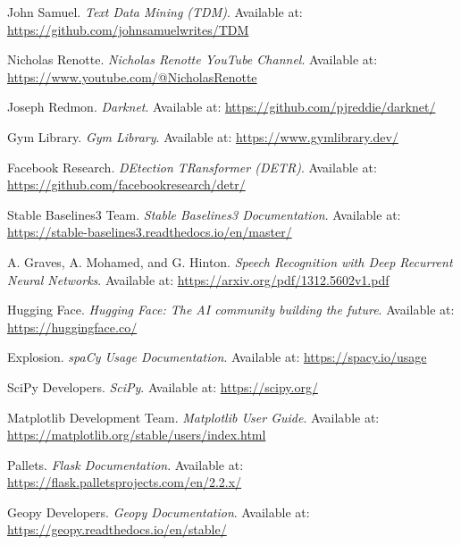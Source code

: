 \documentclass{article}
\begin{document}
    \begin{thebibliography}{9}

        John Samuel.
        \textit{Text Data Mining (TDM)}.
        Available at: \url{https://github.com/johnsamuelwrites/TDM}

        Nicholas Renotte.
        \textit{Nicholas Renotte YouTube Channel}.
        Available at: \url{https://www.youtube.com/@NicholasRenotte}

        Joseph Redmon.
        \textit{Darknet}.
        Available at: \url{https://github.com/pjreddie/darknet/}

        Gym Library.
        \textit{Gym Library}.
        Available at: \url{https://www.gymlibrary.dev/}

        Facebook Research.
        \textit{DEtection TRansformer (DETR)}.
        Available at: \url{https://github.com/facebookresearch/detr/}

        Stable Baselines3 Team.
        \textit{Stable Baselines3 Documentation}.
        Available at: \url{https://stable-baselines3.readthedocs.io/en/master/}

        A. Graves, A. Mohamed, and G. Hinton.
        \textit{Speech Recognition with Deep Recurrent Neural Networks}.
        Available at: \url{https://arxiv.org/pdf/1312.5602v1.pdf}

        Hugging Face.
        \textit{Hugging Face: The AI community building the future}.
        Available at: \url{https://huggingface.co/}

        Explosion.
        \textit{spaCy Usage Documentation}.
        Available at: \url{https://spacy.io/usage}

        SciPy Developers.
        \textit{SciPy}.
        Available at: \url{https://scipy.org/}

        Matplotlib Development Team.
        \textit{Matplotlib User Guide}.
        Available at: \url{https://matplotlib.org/stable/users/index.html}

        Pallets.
        \textit{Flask Documentation}.
        Available at: \url{https://flask.palletsprojects.com/en/2.2.x/}

        Geopy Developers.
        \textit{Geopy Documentation}.
        Available at: \url{https://geopy.readthedocs.io/en/stable/}

    \end{thebibliography}
\end{document}
